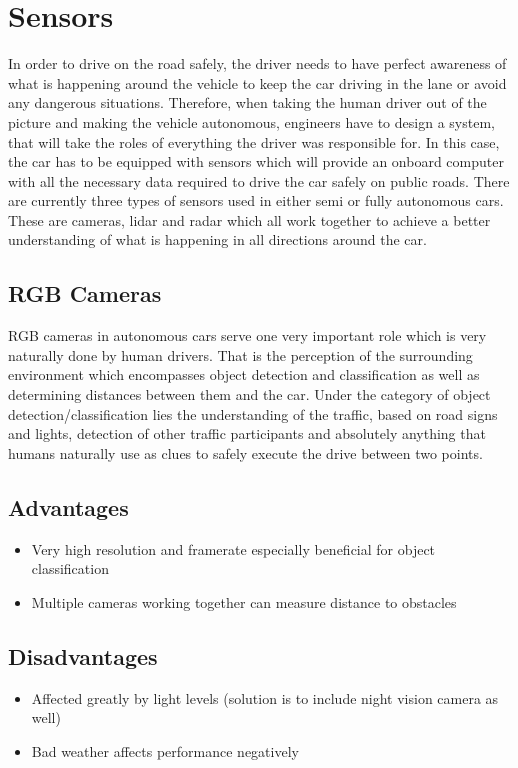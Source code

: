 
\section{Sensors} \label{sensors}
In order to drive on the road safely, the driver needs to have perfect awareness of what is happening around the vehicle to keep the car driving in the lane or avoid any dangerous situations. Therefore, when taking the human driver out of the picture and making the vehicle autonomous, engineers have to design a system, that will take the roles of everything the driver was responsible for. In this case, the car has to be equipped with sensors which will provide an onboard computer with all the necessary data required to drive the car safely on public roads. There are currently three types of sensors used in either semi or fully autonomous cars. These are cameras, lidar and radar which all work together to achieve a better understanding of what is happening in all directions around the car. 

\subsection{RGB Cameras}  
RGB cameras in autonomous cars serve one very important role which is very naturally done by human drivers. That is the perception of the surrounding environment which encompasses object detection and classification as well as determining distances between them and the car. 
Under the category of object detection/classification lies the understanding of the traffic, based on road signs and lights, detection of other traffic participants and absolutely anything that humans naturally use as clues to safely execute the drive between two points. 
\subsection*{Advantages}
\begin{itemize}
  \item Very high resolution and framerate especially beneficial for object classification
  \item Multiple cameras working together can measure distance to obstacles
\end{itemize}
\subsection*{Disadvantages}
  \begin{itemize}
  \item Affected greatly by light levels (solution is to include night vision camera as well)
  \item Bad weather affects performance negatively
\end{itemize} \cite{LidarRad25:online}

